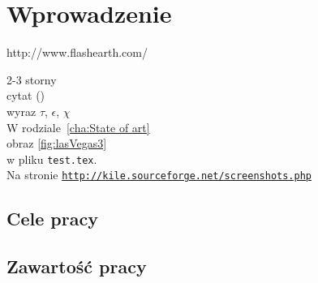 \chapter{Wprowadzenie}
\label{cha:wprowadzenie}

http://www.flashearth.com/

2-3 storny\\
cytat (\cite{JsonXmlComp})\\
wyraz $\tau$, $\epsilon$, $\chi$\\
W rodziale~\ref{cha:State of art}\\
obraz \ref{fig:lasVegas3}\\
w pliku \texttt{test.tex}.\\
Na stronie \underline{\texttt{http://kile.sourceforge.net/screenshots.php}}\\

\section{Cele pracy}
\label{sec:celePracy}


\section{Zawartość pracy}
\label{sec:zawartoscPracy}



















